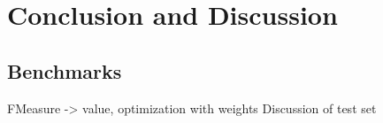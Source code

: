 %
\section{Conclusion and Discussion}
\label{sec_conclusion}

\subsection{Benchmarks}
FMeasure -> value, optimization with weights
Discussion of test set